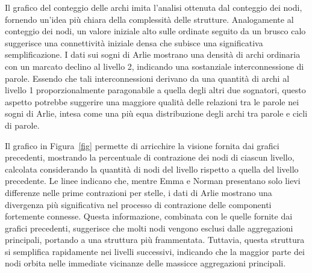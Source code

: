 Il grafico del conteggio delle archi imita l'analisi ottenuta dal conteggio dei nodi, fornendo un'idea più chiara
della complessità delle strutture.
Analogamente al conteggio dei nodi, un valore iniziale alto sulle ordinate seguito da un brusco calo suggerisce
una connettività iniziale densa che subisce una significativa semplificazione.
I dati sui sogni di Arlie mostrano una densità di archi ordinaria con un marcato declino al livello 2, indicando una
sostanziale interconnessione di parole.
Essendo che tali interconnessioni derivano da una quantità di archi al livello 1 proporzionalmente
paragonabile a quella degli altri due sognatori, questo aspetto potrebbe suggerire una maggiore qualità delle relazioni
tra le parole nei sogni di Arlie, intesa come una più equa distribuzione degli archi tra parole e cicli di parole.

Il grafico in Figura~\ref{fig} permette di arricchire la visione fornita dai grafici precedenti, mostrando la
percentuale di contrazione dei nodi di ciascun livello, calcolata considerando la quantità di nodi del livello
rispetto a quella del livello precedente.
Le linee indicano che, mentre Emma e Norman presentano solo lievi differenze nelle prime contrazioni per stelle, i dati
di Arlie mostrano una divergenza più significativa nel processo di contrazione delle componenti fortemente connesse.
Questa informazione, combinata con le quelle fornite dai grafici precedenti, suggerisce che molti nodi vengono esclusi
dalle aggregazioni principali, portando a una struttura più frammentata.
Tuttavia, questa struttura si semplifica rapidamente nei livelli successivi, indicando che la maggior parte dei nodi
orbita nelle immediate vicinanze delle massicce aggregazioni principali.

